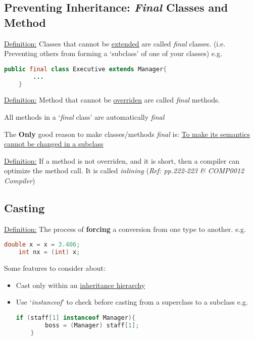 \documentclass[12pt]{article}
\begin{document}
\subsection{Preventing Inheritance: \emph{Final} Classes and Method}
\underline{Definition:} Classes that cannot be \underline{extended} are called \textit{final} classes. 
(i.e. Preventing others from forming a `subclass' of one of your classes)\newline
e.g.
\begin{lstlisting}[language=Java]
    public final class Executive extends Manager{
        ...
    }
\end{lstlisting}

\underline{Definition:} Method that cannot be \underline{overriden} are called \textit{final} methods.

All methods in a `\textit{final} class' are automatically \textit{final}

The \textbf{Only} good reason to make classes/methods \emph{final} is:\newline
\underline{To make its semantics cannot be changed in a subclass}

\underline{Definition:} If a method is not overriden, and it is short,
then a compiler can optimize the method call. It is called \emph{inlining} (\textit{Ref: pp.222-223 \& COMP0012 Compiler})

\subsection{Casting}
\underline{Definition:} The process of \textbf{forcing} a conversion from one type to another.\newline
e.g.
\begin{lstlisting}[language=Java]
    double x = x = 3.406;
    int nx = (int) x;
\end{lstlisting}

Some features to consider about:
\begin{itemize}
    \item Cast only within an \underline{inheritance hierarchy}
    \item Use `\emph{instanceof}' to check before casting from a superclass to a subclass\newline
    e.g.
    \begin{lstlisting}[language=Java]
    if (staff[1] instanceof Manager){
        boss = (Manager) staff[1];
    }
    \end{lstlisting}
\end{itemize}
\end{document}
